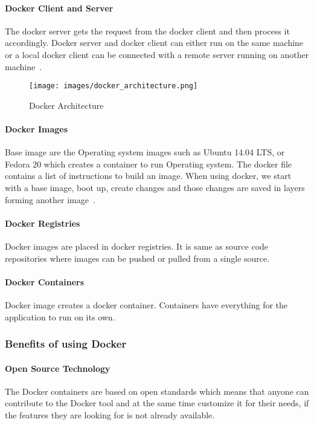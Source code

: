 	\paragraph{Docker Client and Server}
	The docker server gets the request from the docker client and
  then process it accordingly. Docker server and docker client 
  can either run on the same machine or a local docker client
  can be connected with a remote server running on another
  machine~\cite{turnbull2014docker}.
	
	\begin{figure}
		\centering
		\texttt{[image: images/docker\_architecture.png]}
		\caption{Docker Architecture~\cite{turnbull2014docker}} \label{fig:figure1} 
	\end{figure}
    
	\paragraph{Docker Images}
	Base image are the Operating system images such as Ubuntu 14.04 LTS,
  or Fedora 20 which creates a container to run Operating system. 
  The docker file contains a list of instructions to build an image.
  When using docker, we start with a base image, boot up, create
  changes and those changes are saved in layers forming another
  image~\cite{rad2017introduction}.
  
	\paragraph{Docker Registries}
	Docker images are placed in docker registries. It is same as 
  source code repositories where images can be pushed or pulled 
  from a single source.
	
  \paragraph{Docker Containers}
	Docker image creates a docker container. Containers have 
  everything for the application to run on its own.
	
	\subsubsection{Benefits of using Docker}
  
	\paragraph{Open Source Technology}
	The Docker containers are based on open standards which means
  that anyone can contribute to the Docker tool and at the same
  time customize it for their needs, if the features they are 
  looking for is not already available.
  
